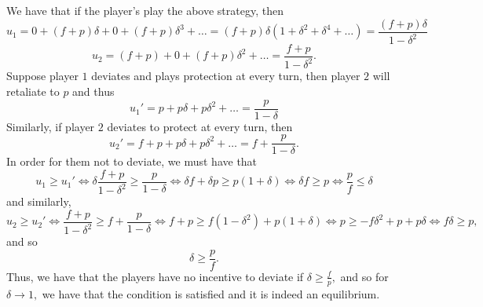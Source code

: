 \documentclass[11pt]{article}
\begin{document}
\begin{solution}
    We have that if the player's play the above strategy, then 
    \[u_1 = 0 + (f + p)\delta + 0 + (f + p)\delta^3 + \dots = (f+p)\delta(1 + \delta^2 + \delta^4 + \dots) = \frac{(f + p)\delta}{1 - \delta^2}\]
    \[u_2 = (f +p) + 0 + (f + p)\delta^2 + \dots = \frac{f + p}{1- \delta^2}.\]
    Suppose player $1$ deviates and plays protection at every turn, then player $2$ will retaliate to $p$ and thus 
    \[u_1' = p + p\delta  + p\delta^2 + \dots = \frac{p}{1-\delta}\]
    Similarly, if player $2$ deviates to protect at every turn, then 
    \[u_2' = f+ p + p\delta + p\delta^2 + \dots  = f + \frac{p}{1-\delta}.\] In order for them not to deviate, we must have that 
    \[u_1 \geq u_1' \iff \delta\frac{f + p}{1-\delta^2} \geq \frac{p}{1-\delta} \iff \delta f + \delta p \geq p(1 + \delta) \iff \delta f \geq p \iff \frac{p}{f}\leq \delta\] and similarly, 
    \[u_2 \geq u_2' \iff \frac{f + p}{1 - \delta^2}\geq f + \frac{p}{1 - \delta} \iff f + p \geq f(1-\delta^2) + p(1 + \delta) \iff p \geq -f\delta^2 + p + p\delta \iff f\delta \geq p,\] and so 
    \[\delta \geq \frac{p}{f}.\] Thus, we have that the players have no incentive to deviate if $\delta \geq \frac{f}{p},$ and so for $\delta \to 1,$ we have that the condition is satisfied and it is indeed an equilibrium.
    
\end{solution}
\end{document}
